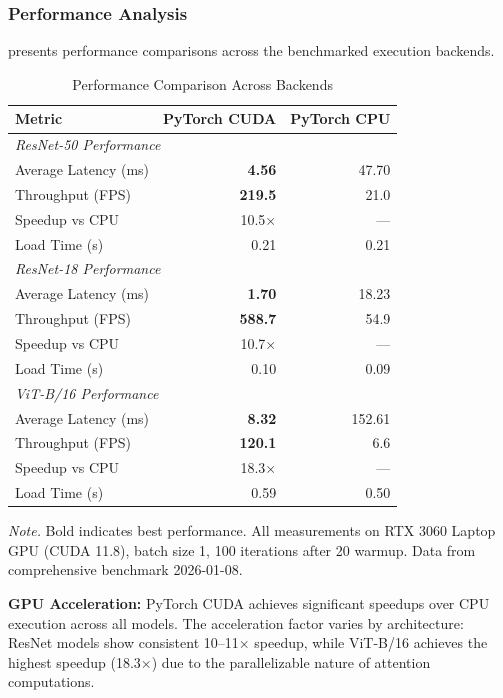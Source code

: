 \documentclass[10pt,twocolumn,a4paper]{article}
\theoremstyle{definition}
\theoremstyle{plain}
\newcommand{\timesX}[1]{#1$\times$}
\begin{document}
\subsubsection{Performance Analysis}

 presents performance comparisons across the benchmarked execution backends.

\begin{table}[t]
\centering
\caption{Performance Comparison Across Backends}
\label{tab:hypothesis_tests}
\scriptsize
\setlength{\tabcolsep}{3pt}
\begin{tabular}{@{}lrr@{}}
\toprule
\textbf{Metric} & \textbf{PyTorch CUDA} & \textbf{PyTorch CPU} \\
\midrule
\multicolumn{3}{l}{\textit{ResNet-50 Performance}} \\
\quad Average Latency (ms) & \textbf{4.56} & 47.70 \\
\quad Throughput (FPS) & \textbf{219.5} & 21.0 \\
\quad Speedup vs CPU & \timesX{10.5} & --- \\
\quad Load Time (s) & 0.21 & 0.21 \\
\midrule
\multicolumn{3}{l}{\textit{ResNet-18 Performance}} \\
\quad Average Latency (ms) & \textbf{1.70} & 18.23 \\
\quad Throughput (FPS) & \textbf{588.7} & 54.9 \\
\quad Speedup vs CPU & \timesX{10.7} & --- \\
\quad Load Time (s) & 0.10 & 0.09 \\
\midrule
\multicolumn{3}{l}{\textit{ViT-B/16 Performance}} \\
\quad Average Latency (ms) & \textbf{8.32} & 152.61 \\
\quad Throughput (FPS) & \textbf{120.1} & 6.6 \\
\quad Speedup vs CPU & \timesX{18.3} & --- \\
\quad Load Time (s) & 0.59 & 0.50 \\
\bottomrule
\end{tabular}

\vspace{0.5em}
\noindent\textit{Note.} Bold indicates best performance. All measurements on RTX 3060 Laptop GPU (CUDA 11.8), batch size 1, 100 iterations after 20 warmup. Data from comprehensive benchmark 2026-01-08.
\end{table}

\textbf{GPU Acceleration:} PyTorch CUDA achieves significant speedups over CPU execution across all models. The acceleration factor varies by architecture: ResNet models show consistent \timesX{10--11} speedup, while ViT-B/16 achieves the highest speedup (\timesX{18.3}) due to the parallelizable nature of attention computations.
\end{document}
